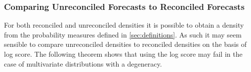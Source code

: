 \documentclass[a4paper, 11pt]{article}
\theoremstyle{theo}
\theoremstyle{definition}
\begin{document}
%

\subsubsection{Comparing Unreconciled Forecasts to Reconciled Forecasts}


For both reconciled and unreconciled densities it is possible to obtain a density from the probability measures defined in \ref{sec:definitions}.  As such it may seem sensible to compare unreconciled densities to reconciled densities on the basis of log score.  The following theorem shows that using the log score may fail in the case of multivariate distributions with a degeneracy.
\end{document}
